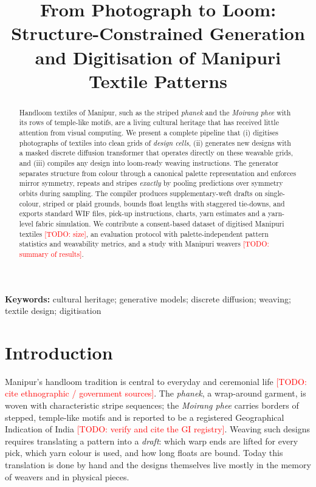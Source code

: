\documentclass[11pt]{article}
\title{From Photograph to Loom: Structure-Constrained Generation and Digitisation of Manipuri Textile Patterns}
\author{\todo{Author names and affiliations}}
\date{}
\newcommand{\todo}[1]{\textcolor{red}{[TODO: #1]}}
\begin{document}
\maketitle

\begin{abstract}
Handloom textiles of Manipur, such as the striped \emph{phanek} and the \emph{Moirang phee} with its
rows of temple-like motifs, are a living cultural heritage that has received little attention
from visual computing. We present a complete pipeline that (i) digitises photographs of textiles
into clean grids of \emph{design cells}, (ii) generates new designs with a masked discrete
diffusion transformer that operates directly on these weavable grids, and (iii) compiles any design
into loom-ready weaving instructions. The generator separates structure from colour through a
canonical palette representation and enforces mirror symmetry, repeats and stripes \emph{exactly}
by pooling predictions over symmetry orbits during sampling. The compiler produces
supplementary-weft drafts on single-colour, striped or plaid grounds, bounds float lengths with
staggered tie-downs, and exports standard WIF files, pick-up instructions, charts, yarn estimates
and a yarn-level fabric simulation. We contribute a consent-based dataset of digitised Manipuri
textiles \todo{size}, an evaluation protocol with palette-independent pattern statistics and
weavability metrics, and a study with Manipuri weavers \todo{summary of results}.
\end{abstract}

\noindent\textbf{Keywords:} cultural heritage; generative models; discrete diffusion; weaving;
textile design; digitisation

\section{Introduction}

Manipur's handloom tradition is central to everyday and ceremonial life \todo{cite ethnographic /
government sources}. The \emph{phanek}, a wrap-around garment, is woven with characteristic
stripe sequences; the \emph{Moirang phee} carries borders of stepped, temple-like motifs and is
reported to be a registered Geographical Indication of India \todo{verify and cite the GI
registry}. Weaving such designs requires translating a pattern into a \emph{draft}: which warp
ends are lifted for every pick, which yarn colour is used, and how long floats are bound. Today
this translation is done by hand and the designs themselves live mostly in the memory of weavers
and in physical pieces.
\end{document}
